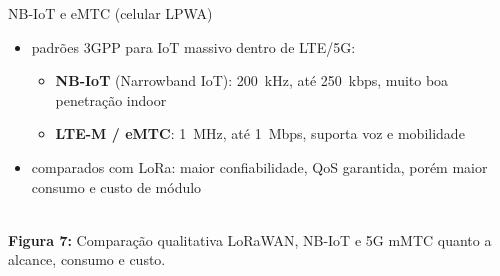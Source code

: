 \documentclass[aspectratio=169,11pt]{beamer}
\begin{document}
\begin{frame}{NB-IoT e eMTC (celular LPWA)}
  \begin{itemize}
    \item padrões 3GPP para IoT massivo dentro de LTE/5G:
      \begin{itemize}
        \item \textbf{NB-IoT} (Narrowband IoT): 200~kHz, até 250~kbps, muito boa penetração indoor
        \item \textbf{LTE-M / eMTC}: 1~MHz, até 1~Mbps, suporta voz e mobilidade
      \end{itemize}
    \item comparados com LoRa: maior confiabilidade, QoS garantida, porém maior consumo e custo de módulo
  \end{itemize}
  \pause
  \begin{center}
    \\[1mm]
    {\scriptsize \textbf{Figura 7:} Comparação qualitativa LoRaWAN, NB-IoT e 5G mMTC quanto a alcance, consumo e custo.}
  \end{center}
\end{frame}
\end{document}
